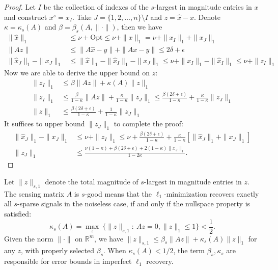 \begin{proof}
Let $I$ be the collection of indexes of the $s$-largest  in magnitude entries in $x$ and construct $x^s=x_I$.
Take $J=\{1,2,\ldots,n\}\setminus I$ and $z=\hat{x}-x$.
Denote $\kappa=\kappa_s(A)$ and $\beta=\beta_s(A,\|\cdot\|)$, then we have
\begin{align*}
\|\hat{x}\|_1&\le\nu+\text{Opt}\le\nu+\|x\|_1=\nu+\|x_I\|_1+\|x_J\|_1\\
\|Az\|&\le\|A\hat{x}-y\|+\|Ax-y\|\le2\delta+\epsilon\\
\|\hat{x}_J\|_1-\|x_J\|_1&\le \|\hat{x}\|_1-\|\hat{x}_I\|_1-\|x_J\|_1\le \nu+\|x_I\|_1-\|\hat{x}_I\|_1\le\nu+\|z_I\|_1
\end{align*}
Now we are able to derive the upper bound on $z$:
\begin{align*}
\|z_I\|_1&\le\beta\|Az\| + \kappa(A)\|z\|_1\\
\|z_I\|_1&\le\frac{\beta}{1-\kappa}\|Az\| + \frac{\kappa}{1-\kappa}\|z_J\|_1\le
\frac{\beta(2\delta+\epsilon)}{1-\kappa} + \frac{\kappa}{1-\kappa}\|z_J\|_1\\
\|z\|_1&\le \frac{\beta(2\delta+\epsilon)}{1-\kappa} + \frac{1}{1-\kappa}\|z_J\|_1
\end{align*}
It suffices to upper bound $\|z_J\|_1$ to complete the proof:
\begin{align*}
\|\hat{x}_J\|_1 - \|x_J\|_1&\le \nu+\|z_I\|_1\le
\nu+\frac{\beta(2\delta+\epsilon)}{1-\kappa} + \frac{\kappa}{1-\kappa}[\|\hat{x}_J\|_1 + \|x_J\|_1]\\
\|z_J\|_1&\le\frac{\nu(1-\kappa)+\beta(2\delta+\epsilon)+2(1-\kappa)\|x_J\|_1}{1-2\kappa}.
\end{align*}
\end{proof}

\begin{remark}
Let $\|z\|_{s,1}$ denote the total magnitude of $s$-largest in magnitude entries in $z$.
The sensing matrix $A$ is $s$-good means that the $\ell_1$-minimization recovers exactly all $s$-sparse signals in the noiseless case, if and only if the nullspace property is satisfied:
\[
\kappa_s(A)=\max_{z}~\{\|z\|_{s,1}:~Az=0, \|z\|_1\le 1\}<\frac{1}{2}.
\]
Given the norm $\|\cdot\|$ on $\mathbb{R}^m$, we have $\|z\|_{s,1}\le\beta_s\|Az\|+\kappa_s(A)\|z\|_1$ for any $z$, with properly selected $\beta_s$.
When $\kappa_s(A)<1/2$, the term $\beta_s,\kappa_s$ are responsible for error bounds in imperfect $\ell_1$ recovery.
\end{remark}

